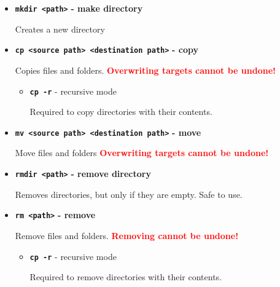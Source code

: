 \documentclass[aspectratio=1610]{beamer}
\newcommand\curtitle{}
\newcommand\command[1]{\alert{\textbf{\texttt{#1}}}}
\begin{document}
\begin{frame}[c]{\curtitle}
    \begin{itemize}[<+->]
        \setlength\itemsep{1em}
        \item \command{mkdir <path>} \textbf{- make directory} 

            Creates a new directory
        \item \command{cp <source path> <destination path>} \textbf{- copy} 

            Copies files and folders. \textcolor{red}{\textbf{Overwriting targets cannot be
            undone!}}
            \begin{itemize}[<.->]
                \item \command{cp -r} - recursive mode

                    Required to copy directories with their contents.
            \end{itemize}
        \item \command{mv <source path> <destination path>} \textbf{- move} 

            Move files and folders \textcolor{red}{\textbf{Overwriting targets cannot be undone!}}
        \item \command{rmdir <path>} \textbf{- remove directory} 

            Removes directories, but only if they are empty. Safe to use.
    \end{itemize}
\end{frame}


\begin{frame}[c]{\curtitle}
    \begin{itemize}[<+->]
        \setlength\itemsep{1em}
        \item \command{rm <path>} \textbf{- remove} 

            Remove files and folders. \textcolor{red}{\textbf{Removing cannot be undone!}}
            \begin{itemize}[<.->]
                \item \command{cp -r} - recursive mode

                    Required to remove directories with their contents.
            \end{itemize}
    \end{itemize}
\end{frame}
\end{document}
